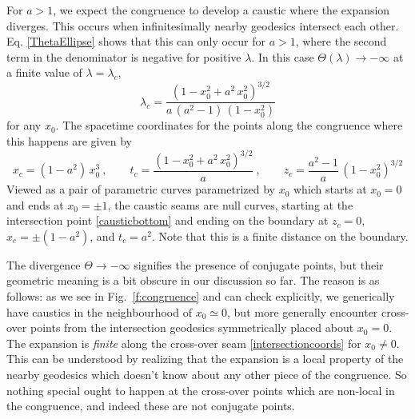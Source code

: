\documentclass[12pt]{article}
\begin{document}
For $a > 1$, we expect the congruence to develop a caustic where the expansion diverges. This occurs when infinitesimally nearby geodesics intersect each other. Eq. \eqref{ThetaEllipse} shows that this can only occur for $a>1$, where the second term in the denominator is negative for positive $\lambda$. In this case $\Theta(\lambda) \to -\infty$ at a finite value of $\lambda = \lambda_c$, 
%
\begin{equation}
\lambda_c = \frac{ (1-x_0^2+a^2 \, x_0^2)^{3/2}}{a \, (a^2-1) \, (1-x_0^2)}
\label{}
\end{equation}	
%
for any $x_0$.  The spacetime coordinates for the points along the congruence where this happens are given by 
%
\begin{equation}
x_c = (1-a^2) \, x_0^3 \ , \qquad
t_c = \frac{ (1-x_0^2+a^2 \, x_0^2)^{3/2}}{a} \ , \qquad
z_c = \frac{a^2-1}{a} \,  (1-x_0^2)^{3/2} 
\label{divergingTheta}
\end{equation}	
%
Viewed as a pair of parametric curves parametrized by $x_0$ which starts at $x_0=0$ and ends at $x_0=\pm 1$, the caustic seams are null curves, starting at the intersection point \eqref{causticbottom} and ending on the boundary at $z_c =0$, $x_c = \pm (1-a^2)$, and $t_c = a^2$.  Note that this is a finite distance on the boundary.

The divergence $\Theta \to -\infty$ signifies the presence of conjugate points, but their geometric meaning is a bit obscure in our discussion so far. The reason is as follows:  as we see  in Fig.~\ref{f:congruence} and can check explicitly, we generically have caustics in the neighbourhood of $x_0 \simeq 0$, but more generally encounter  cross-over points from the intersection geodesics symmetrically placed about $x_0 = 0$. The expansion is {\it finite} along the cross-over seam \eqref{intersectioncoords} for $x_0 \neq 0$.  This can be understood by realizing that the expansion is a local property of the nearby geodesics which doesn't know about any other piece of the congruence. So nothing special ought to happen at the cross-over points which are non-local in the congruence, and indeed these are not conjugate points.
\end{document}
